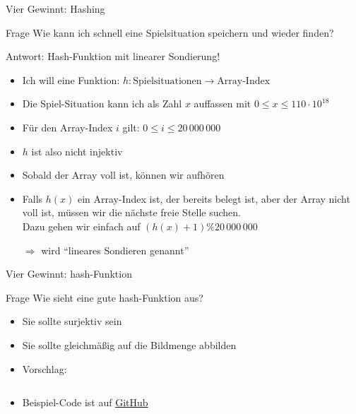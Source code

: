 \documentclass[usepdftitle=false,hyperref={pdfpagelabels=false}]{beamer}
\begin{document}
\begin{frame}{Vier Gewinnt: Hashing}
    \begin{block}{Frage}
        Wie kann ich schnell eine Spielsituation speichern und wieder
        finden?
    \end{block}

    Antwort: Hash-Funktion mit linearer Sondierung!

    \pause

    \begin{itemize}[<+->]
        \item Ich will eine Funktion: $h: \text{Spielsituationen} \rightarrow \text{Array-Index}$
        \item Die Spiel-Situation kann ich als Zahl $x$ auffassen mit $0 \leq x \leq 110 \cdot 10^{18}$
        \item Für den Array-Index $i$ gilt: $0 \leq i \le 20\,000\,000$
        \item $h$ ist also nicht injektiv
        \item Sobald der Array voll ist, können wir aufhören
        \item Falls $h(x)$ ein Array-Index ist, der bereits belegt ist, aber der Array nicht voll ist, müssen wir
              die nächste freie Stelle suchen.\\
              Dazu gehen wir einfach auf $(h(x) + 1) \% 20\,000\,000$
        \item[$\Rightarrow$] wird "`lineares Sondieren genannt"'
    \end{itemize}
\end{frame}

\begin{frame}{Vier Gewinnt: hash-Funktion}
    \begin{block}{Frage}
        Wie sieht eine gute hash-Funktion aus?
    \end{block}

    \begin{itemize}[<+->]
        \item Sie sollte surjektiv sein
        \item Sie sollte gleichmäßig auf die Bildmenge abbilden
        \item Vorschlag: \inputminted[linenos=true, numbersep=5pt, tabsize=4, fontsize=\tiny]{c}{vierGewinnt.c}
        \item Beispiel-Code ist auf \href{https://github.com/MartinThoma/connect-four/blob/master/C/connectfour.c}{GitHub}
    \end{itemize}
\end{frame}
\end{document}
